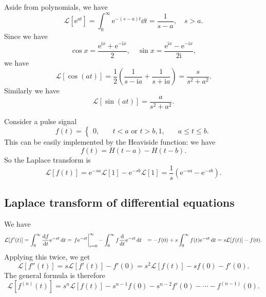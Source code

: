 \documentclass[hyperref, a4paper]{article}
\newcommand*{\ii}{\mathrm{i}}
\newcommand*{\ee}{\mathrm{e}}
\def\\{}%
\newcommand*{\laplace}{\mathcal{L}}
\newcommand*{\zerotoinf}{\int_{0}^{\infty}}
\begin{document}
Aside from polynomials, 
we have 
\begin{equation}
    \laplace[\ee^{at}] = \zerotoinf \ee^{-(s-a) t} \dd{t} = \frac{1}{s- a}, 
    \quad s > a. 
    \label{eq:eat-to-s-minus-a}
\end{equation}
Since we have 
\[
    \cos x = \frac{\ee^{\ii x} + \ee^{- \ii x}}{2}, \quad 
    \sin x = \frac{\ee^{\ii x} - \ee^{- \ii x}}{2 \ii}, 
\]
we have 
\begin{equation}
    \laplace[\cos (at)] = \frac{1}{2} \left(
        \frac{1}{s - \ii a} + \frac{1}{s + \ii a}
    \right) = \frac{s}{s^2 + a^2}.
\end{equation}
Similarly we have 
\begin{equation}
    \laplace[\sin(at)] = \frac{a}{s^2 + a^2}.
\end{equation}

Consider a pulse signal 
\begin{equation}
    f(t) = \begin{cases}
        0, &\quad t < a \text{ or } t > b, \\
        1, &\quad a \leq t \leq b.
    \end{cases}
\end{equation}
This can be easily implemented by the Heaviside function: 
we have 
\begin{equation}
    f(t) = H(t-a) - H(t-b).
\end{equation}
So the Laplace transform is 
\begin{equation}
    \laplace[f(t)] = \ee^{-sa} \laplace[1] - \ee^{- sb} \laplace[1]
    = \frac{1}{s} (\ee^{-sa} - \ee^{-sb}).
\end{equation}

\subsection{Laplace transform of differential equations}

We have 
\begin{equation}
    \begin{aligned}
        \laplace[f'(t)] &= \zerotoinf \dv{f}{t} \ee^{-st} \dd{t} 
        = \eval{f \ee^{-st}}_{s=0}^{\infty} 
        - \zerotoinf f \dv{t} \ee^{-st} \dd{t} \\ 
        &= - f(0) + s \zerotoinf f(t) \ee^{-st} \dd{t} 
        = s \laplace[f(t)] - f(0).
    \end{aligned}
\end{equation}
Applying this twice, we get 
\begin{equation}
    \laplace[f''(t)] = s \laplace[f'(t)] - f'(0) = s^2 \laplace[f(t)] - s f(0) - f'(0).
\end{equation}
The general formula is therefore 
\begin{equation}
    \laplace[f^{(n)}(t)] = s^n \laplace[f(t)] - s^{n-1} f(0) - s^{n-2} f'(0) - \cdots - f^{(n-1)}(0).
\end{equation}
\end{document}
